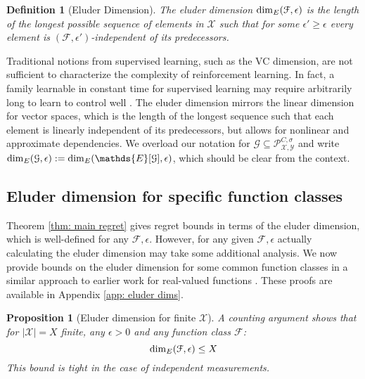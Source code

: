 \documentclass{article}
\newtheorem{mydef}{Definition}
\newtheorem{prop}{Proposition}
\newcommand{\Exp}{\mathds{E}}
\newcommand{\Xc}{\mathcal{X}}
\newcommand{\Yc}{\mathcal{Y}}
\newcommand{\Pc}{\mathcal{P}}
\newcommand{\Fc}{\mathcal{F}}
\newcommand{\Gc}{\mathcal{G}}
\begin{document}
\begin{mydef}[Eluder Dimension]
\label{def: Eluder} \hspace{0.00000000000001mm} \newline
The eluder dimension ${\rm dim}_E(\Fc,\epsilon)$ is the length of the longest possible sequence of elements in $\Xc$ such that for some $\epsilon' \ge \epsilon$ every element is $(\Fc,\epsilon')$-independent of its predecessors.
\end{mydef}

Traditional notions from supervised learning, such as the VC dimension, are not sufficient to characterize the complexity of reinforcement learning.
In fact, a family learnable in constant time for supervised learning may require arbitrarily long to learn to control well \cite{russo2013eluder}.
The eluder dimension mirrors the linear dimension for vector spaces, which is the length of the longest sequence such that each element is linearly independent of its predecessors, but allows for nonlinear and approximate dependencies.
We overload our notation for $\Gc \subseteq \Pc^{C,\sigma}_{\Xc,\Yc}$ and write ${\rm dim}_E(\Gc,\epsilon) := {\rm dim}_E(\Exp[\Gc],\epsilon)$, which should be clear from the context.



\subsection{Eluder dimension for specific function classes}
Theorem \ref{thm: main regret} gives regret bounds in terms of the eluder dimension, which is well-defined for any $\Fc, \epsilon$.
However, for any given $\Fc,\epsilon$ actually calculating the eluder dimension may take some additional analysis.
We now provide bounds on the eluder dimension for some common function classes in a similar approach to earlier work for real-valued functions \cite{russo2013}.
These proofs are available in Appendix \ref{app: eluder dims}.

\begin{prop}[Eluder dimension for finite $\mathcal{X}$]
\hspace{0.00000000000001mm} \newline
A counting argument shows that for $| \mathcal{X} | = X$ finite, any $\epsilon>0$ and any function class $\Fc$:
$$ {\rm dim}_E( \mathcal{F}, \epsilon) \le X $$
This bound is tight in the case of independent measurements.
\end{prop}
\end{document}
